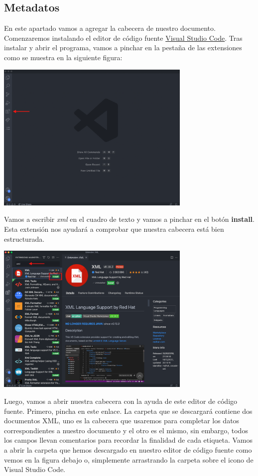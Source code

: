 \documentclass[
]{book}
\begin{document}
\hypertarget{metadatos-1}{%
\subsection*{Metadatos}\label{metadatos-1}}

En este apartado vamos a agregar la cabecera de nuestro documento. Comenzaremos instalando el editor de código fuente \href{https://code.visualstudio.com/}{Visual Studio Code}.
Tras instalar y abrir el programa, vamos a pinchar en la pestaña de las extensiones como se muestra en la siguiente figura:

\includegraphics[width=0.7\textwidth,height=\textheight]{img/vsc.png}

Vamos a escribir \emph{xml} en el cuadro de texto y vamos a pinchar en el botón \textbf{install}. Esta extensión nos ayudará a comprobar que nuestra cabecera está bien estructurada.

\includegraphics[width=0.7\textwidth,height=\textheight]{img/vsc2.png}

Luego, vamos a abrir nuestra cabecera con la ayuda de este editor de código fuente. Primero, pincha en este enlace. La carpeta que se descargará contiene dos documentos XML, uno es la cabecera que usaremos para completar los datos correspondientes a nuestro documento y el otro es el mismo, sin embargo, todos los campos llevan comentarios para recordar la finalidad de cada etiqueta.
Vamos a abrir la carpeta que hemos descargado en nuestro editor de código fuente como vemos en la figura debajo o, simplemente arrastrando la carpeta sobre el icono de Visual Studio Code.
\end{document}
